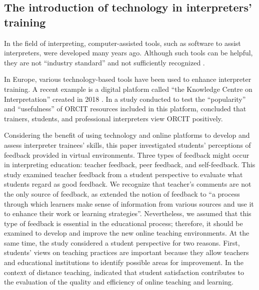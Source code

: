 \documentclass[english]{textolivre}
\begin{document}
\subsection{The introduction of technology in interpreters’ training}
In the field of interpreting, computer-assisted tools, such as software to assist interpreters, were developed many years ago. Although such tools can be helpful, they are not “industry standard” and not sufficiently recognized \cite[p. 1-2]{karaban_exploring_2021}.

In Europe, various technology-based tools have been used to enhance interpreter training. A recent example is a digital platform called “the Knowledge Centre on Interpretation” created in 2018 \cite[p. 1-2]{carsten_challenge_2021}. In a study conducted to test the “popularity” and “usefulness” of ORCIT resources included in this platform, \textcite[p. 14]{carsten_challenge_2021} concluded that trainers, students, and professional interpreters view ORCIT positively.

Considering the benefit of using technology and online platforms to develop and assess interpreter trainees’ skills, this paper investigated students’ perceptions of feedback provided in virtual environments. Three types of feedback might occur in interpreting education: teacher feedback, peer feedback, and self-feedback. This study examined teacher feedback from a student perspective to evaluate what students regard as good feedback. We recognize that teacher’s comments are not the only source of feedback, as \textcite[p. 1315]{carless_development_2018} extended the notion of feedback to “a process through which learners make sense of information from various sources and use it to enhance their work or learning strategies”. Nevertheless, we assumed that this type of feedback is essential in the educational process; therefore, it should be examined to develop and improve the new online teaching environments. At the same time, the study considered a student perspective for two reasons. First, students’ views on teaching practices are important because they allow teachers and educational institutions to identify possible areas for improvement. In the context of distance teaching, \textcite[p. 10]{susilana_studentsa_2020} indicated that student satisfaction contributes to the evaluation of the quality and efficiency of online teaching and learning.
\end{document}
